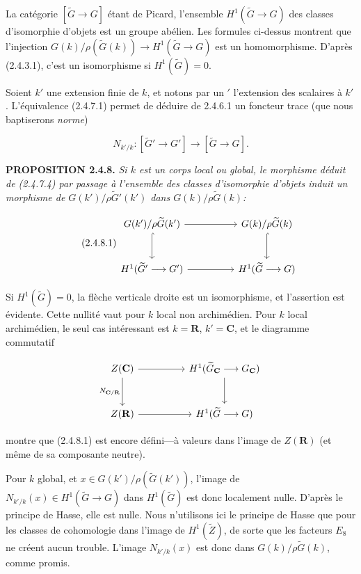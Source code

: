 \documentclass[10pt,a4paper]{article}
\begin{document}
La catégorie \([\widetilde G\to G]\) étant de Picard, l'ensemble \(H^1(\widetilde G\to G)\) des classes d'isomorphie d'objets est un groupe abélien. Les formules ci-dessus montrent que l'injection \(G(k)/\rho(\widetilde G(k))\to H^1(\widetilde G\to G)\) est un homomorphisme. D'après (2.4.3.1), c'est un isomorphisme si \(H^1(\widetilde G)=0\).

Soient \(k'\) une extension finie de \(k\), et notons par un \('\) l'extension des scalaires à \(k'\). L'équivalence (2.4.7.1) permet de déduire de 2.4.6.1 un foncteur trace (que nous baptiserons \emph{norme})

\[
N_{k'/k}:[\widetilde G'\longrightarrow G']\longrightarrow[\widetilde G\longrightarrow G]. \tag{2.4.7.4}
\]

\textbf{PROPOSITION 2.4.8.} \emph{Si \(k\) est un corps local ou global, le morphisme déduit de (2.4.7.4) par passage à l'ensemble des classes d'isomorphie d'objets induit un morphisme de \(G(k')/\rho\widetilde G'(k')\) dans \(G(k)/\rho\widetilde G(k)\):}

\[
\tag{2.4.8.1}
\begin{tikzcd}[column sep=huge,row sep=large]
G(k')/\rho\widetilde G(k') \arrow[r] \arrow[d,hook] & G(k)/\rho\widetilde G(k) \arrow[d,hook] \\
H^1(\widetilde G'\longrightarrow G') \arrow[r] & H^1(\widetilde G\longrightarrow G)
\end{tikzcd}
\]

Si \(H^1(\widetilde G)=0\), la flèche verticale droite est un isomorphisme, et l'assertion est évidente. Cette nullité vaut pour \(k\) local non archimédien. Pour \(k\) local archimédien, le seul cas intéressant est \(k=\mathbf R\), \(k'=\mathbf C\), et le diagramme commutatif

\[
\begin{tikzcd}[column sep=huge,row sep=large]
Z(\mathbf C) \arrow[r] \arrow[d,"N_{\mathbf C/\mathbf R}"'] & H^1(\widetilde G_{\mathbf C}\longrightarrow G_{\mathbf C}) \arrow[d] \\
Z(\mathbf R) \arrow[r] & H^1(\widetilde G\longrightarrow G)
\end{tikzcd}
\]

montre que (2.4.8.1) est encore défini---à valeurs dans l'image de \(Z(\mathbf R)\) (et même de sa composante neutre).

Pour \(k\) global, et \(x\in G(k')/\rho(\widetilde G(k'))\), l'image de \(N_{k'/k}(x)\in H^1(\widetilde G\to G)\) dans \(H^1(\widetilde G)\) est donc localement nulle. D'après le principe de Hasse, elle est nulle. Nous n'utilisons ici le principe de Hasse que pour les classes de cohomologie dans l'image de \(H^1(\widetilde Z)\), de sorte que les facteurs \(E_8\) ne créent aucun trouble. L'image \(N_{k'/k}(x)\) est donc dans \(G(k)/\rho\widetilde G(k)\), comme promis.
\end{document}
